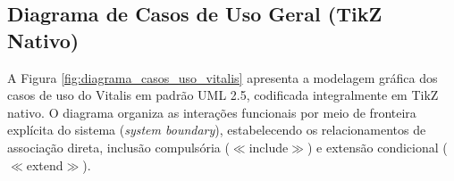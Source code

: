 \subsection{Diagrama de Casos de Uso Geral (TikZ Nativo)}
\label{sec:diagrama_tikz}

A Figura \ref{fig:diagrama_casos_uso_vitalis} apresenta a modelagem gráfica dos casos de uso do Vitalis em padrão UML 2.5, codificada integralmente em TikZ nativo. O diagrama organiza as interações funcionais por meio de fronteira explícita do sistema (\textit{system boundary}), estabelecendo os relacionamentos de associação direta, inclusão compulsória ($\ll$include$\gg$) e extensão condicional ($\ll$extend$\gg$).

